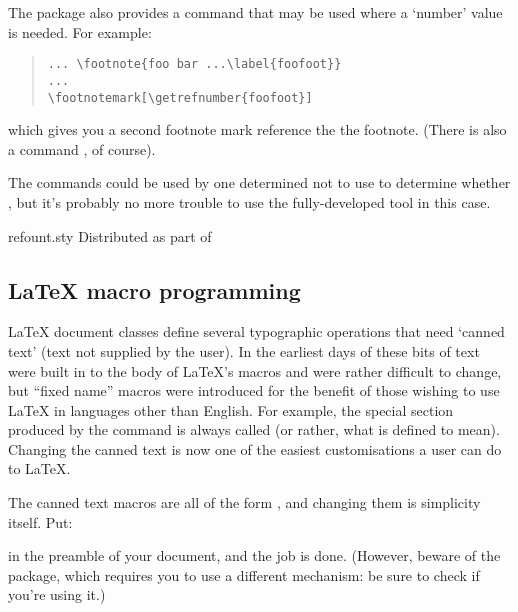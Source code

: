 The package also provides a command
 that may be used where a
`number' value is needed.  For example:
\begin{quote}
\begin{verbatim}
... \footnote{foo bar ...\label{foofoot}}
...
\footnotemark[\getrefnumber{foofoot}]
\end{verbatim}
\end{quote}
which gives you a second footnote mark reference the the footnote.
(There is also a command , of course).

The commands could be used by one determined not to use
 to determine whether %
, but it's probably no more
trouble to use the fully-developed tool in this case.
\begin{ctanrefs}
\item[refount.sty]Distributed as part of 
\end{ctanrefs}

\subsection{\LaTeX{} macro programming}


\LaTeX{} document classes define several typographic operations that
need `canned text' (text not supplied by the user).  In the earliest
days of \LaTeXo{} these bits of text were built in to the body of
\LaTeX{}'s macros and were rather difficult to change, but ``fixed
name'' macros were introduced for the benefit of those wishing to use
\LaTeX{} in languages other than English.
For example, the special section produced by the 
command is always called  (or rather, what
 is defined to mean).
Changing the canned text is now one of the easiest customisations a
user can do to \LaTeX{}.

The canned text macros are all of the form
, and changing them is simplicity
itself.  Put:
\begin{quote}
\end{quote}
in the preamble of your document, and the job is done.
(However, beware of the  package, which requires you to
use a different mechanism: be sure to check
 if
you're using it.)

